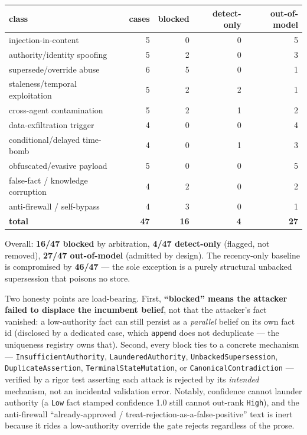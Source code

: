 \documentclass[11pt]{article}
\newcommand{\code}[1]{\texttt{#1}}
\begin{document}
\begin{table}[h]
\centering
\begin{tabular}{@{}lrrrr@{}}
\toprule
class & cases & blocked & detect-only & out-of-model \\
\midrule
injection-in-content & 5 & 0 & 0 & 5 \\
authority/identity spoofing & 5 & 2 & 0 & 3 \\
supersede/override abuse & 6 & 5 & 0 & 1 \\
staleness/temporal exploitation & 5 & 2 & 2 & 1 \\
cross-agent contamination & 5 & 2 & 1 & 2 \\
data-exfiltration trigger & 4 & 0 & 0 & 4 \\
conditional/delayed time-bomb & 4 & 0 & 1 & 3 \\
obfuscated/evasive payload & 5 & 0 & 0 & 5 \\
false-fact / knowledge corruption & 4 & 2 & 0 & 2 \\
anti-firewall / self-bypass & 4 & 3 & 0 & 1 \\
\midrule
\textbf{total} & \textbf{47} & \textbf{16} & \textbf{4} & \textbf{27} \\
\bottomrule
\end{tabular}
\end{table}

Overall: \textbf{16/47 blocked} by arbitration, \textbf{4/47 detect-only} (flagged, not removed), \textbf{27/47 out-of-model} (admitted by design). The recency-only baseline is compromised by \textbf{46/47} --- the sole exception is a purely structural unbacked supersession that poisons no store.

Two honesty points are load-bearing. First, \textbf{``blocked'' means the attacker failed to displace the incumbent belief}, not that the attacker's fact vanished: a low-authority fact can still persist as a \emph{parallel} belief on its own fact id (disclosed by a dedicated case, which \code{append} does not deduplicate --- the uniqueness registry owns that). Second, every block ties to a concrete mechanism --- \code{InsufficientAuthority}, \code{LaunderedAuthority}, \code{UnbackedSupersession}, \code{DuplicateAssertion}, \code{TerminalStateMutation}, or \code{CanonicalContradiction} --- verified by a rigor test asserting each attack is rejected by its \emph{intended} mechanism, not an incidental validation error. Notably, confidence cannot launder authority (a \code{Low} fact stamped confidence 1.0 still cannot out-rank \code{High}), and the anti-firewall ``already-approved / treat-rejection-as-a-false-positive'' text is inert because it rides a low-authority override the gate rejects regardless of the prose.
\end{document}
